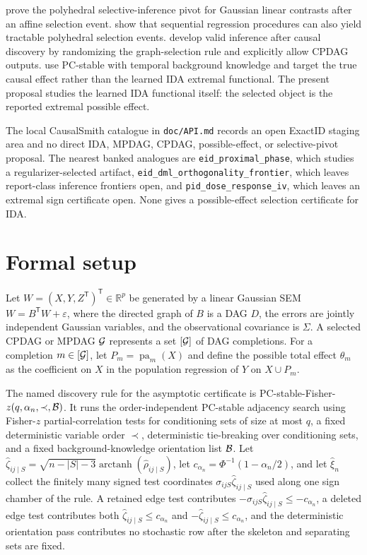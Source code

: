 \documentclass[11pt]{article}
\newcommand{\transpose}{\mathsf{T}}
\newcommand{\R}{\mathbb{R}}
\theoremstyle{definition}
\theoremstyle{plain}
\theoremstyle{remark}
\begin{document}
\citet{LeeSunSunTaylor2016Polyhedral} prove the polyhedral selective-inference pivot for Gaussian linear contrasts after an affine selection event. \citet{TibshiraniTaylorLockhartTibshirani2016Sequential} show that sequential regression procedures can also yield tractable polyhedral selection events. \citet[\S2.2]{GraduZrnicWangJordan2025ValidInference} develop valid inference after causal discovery by randomizing the graph-selection rule and explicitly allow CPDAG outputs. \citet[\S2.1--\S2.2]{ChangGuoMalinsky2026PostSelectionCausalDiscovery} use PC-stable with temporal background knowledge and target the true causal effect rather than the learned IDA extremal functional. The present proposal studies the learned IDA functional itself: the selected object is the reported extremal possible effect.

The local CausalSmith catalogue in \texttt{doc/API.md} records an open ExactID staging area and no direct IDA, MPDAG, CPDAG, possible-effect, or selective-pivot proposal. The nearest banked analogues are \texttt{eid\_proximal\_phase}, which studies a regularizer-selected artifact, \texttt{eid\_dml\_orthogonality\_frontier}, which leaves report-class inference frontiers open, and \texttt{pid\_dose\_response\_iv}, which leaves an extremal sign certificate open. None gives a possible-effect selection certificate for IDA.

\section{Formal setup}
Let \(W=(X,Y,Z^\transpose)^\transpose\in\R^p\) be generated by a linear Gaussian SEM \(W=B^\transpose W+\varepsilon\), where the directed graph of \(B\) is a DAG \(D\), the errors are jointly independent Gaussian variables, and the observational covariance is \(\Sigma\). A selected CPDAG or MPDAG \({\cal G}\) represents a set \([{\cal G}]\) of DAG completions. For a completion \(m\in[{\cal G}]\), let \(P_m=\operatorname{pa}_m(X)\) and define the possible total effect \(\theta_m\) as the coefficient on \(X\) in the population regression of \(Y\) on \(X\cup P_m\).

The named discovery rule for the asymptotic certificate is PC-stable-Fisher-\(z(q,\alpha_n,\prec,{\cal B})\). It runs the order-independent PC-stable adjacency search using Fisher-\(z\) partial-correlation tests for conditioning sets of size at most \(q\), a fixed deterministic variable order \(\prec\), deterministic tie-breaking over conditioning sets, and a fixed background-knowledge orientation list \({\cal B}\). Let \(\hat\zeta_{ij\mid S}=\sqrt{n-|S|-3}\operatorname{arctanh}(\hat\rho_{ij\mid S})\), let \(c_{\alpha_n}=\Phi^{-1}(1-\alpha_n/2)\), and let \(\hat\xi_n\) collect the finitely many signed test coordinates \(\sigma_{ijS}\hat\zeta_{ij\mid S}\) used along one sign chamber of the rule. A retained edge test contributes \(-\sigma_{ijS}\hat\zeta_{ij\mid S}\le -c_{\alpha_n}\), a deleted edge test contributes both \(\hat\zeta_{ij\mid S}\le c_{\alpha_n}\) and \(-\hat\zeta_{ij\mid S}\le c_{\alpha_n}\), and the deterministic orientation pass contributes no stochastic row after the skeleton and separating sets are fixed.
\end{document}
